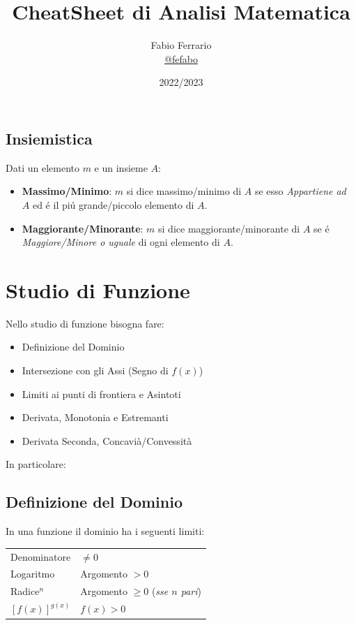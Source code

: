 \documentclass[12pt, a4paper, openany]{book}
\begin{document}
\title{CheatSheet di Analisi Matematica}

\author{
	Fabio Ferrario\\
	\small{\href{https://t.me/fefabo}{@fefabo}}
}
\date{2022/2023}

\maketitle

\tableofcontents

\section*{Insiemistica}

Dati un elemento $m$ e un insieme $A$:
\begin{itemize}
	\item \textbf{Massimo/Minimo}: $m$ si dice massimo/minimo di $A$ se esso \emph{Appartiene ad $A$} ed é il piú grande/piccolo elemento di $A$. 
	\item \textbf{Maggiorante/Minorante}: $m$ si dice maggiorante/minorante di $A$ se é \emph{Maggiore/Minore o uguale} di ogni elemento di $A$.
\end{itemize}

\chapter{Studio di Funzione}
Nello studio di funzione bisogna fare:
\begin{itemize}
	\item Definizione del Dominio
	\item Intersezione con gli Assi (Segno di $f(x)$)
	\item Limiti ai punti di frontiera e Asintoti
	\item Derivata, Monotonia e Estremanti
	\item Derivata Seconda, Concavià/Convessità
\end{itemize}
In particolare:

\section{Definizione del Dominio}
In una funzione il dominio ha i seguenti limiti:\\
\begin{tabular}{ l|l }
	Denominatore    & $\neq 0$                                 \\
	Logaritmo       & Argomento $>0$                           \\
	Radice$^n$      & Argomento $\geq 0$ (\emph{sse $n$ pari}) \\
	$[f(x)]^{g(x)}$ & $f(x)>0$
\end{tabular}
\end{document}
